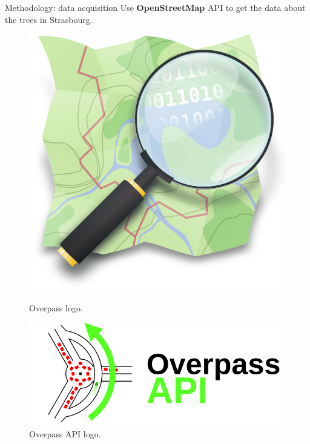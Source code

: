 \documentclass[10pt]{beamer}
\begin{document}
\begin{frame}{Methodology: data acquisition}
  Use \textbf{OpenStreetMap} API to get the data about the trees in Strasbourg.

  \begin{figure}[H]
    \centering
    \begin{minipage}{0.49\textwidth}
        \centering
        \includegraphics[width=\textwidth]{images/osm_logo.png}
        \caption{Overpass logo.}
    \end{minipage}\hfill
    \begin{minipage}{0.49\textwidth}
        \centering
        \includegraphics[width=\textwidth]{images/OvAPI_logo.png}
        \caption{Overpass API logo.}
    \end{minipage}
  \end{figure}
\end{frame}
\end{document}
